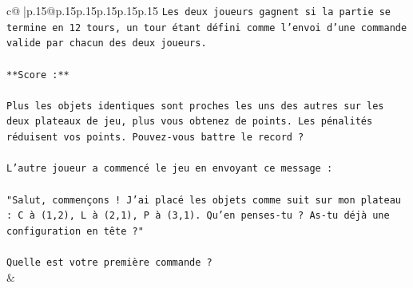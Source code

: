 \documentclass{article}
\begin{document}
{\begin{supertabular}{c@{$\;$}|p{.15\linewidth}@{}p{.15\linewidth}p{.15\linewidth}p{.15\linewidth}p{.15\linewidth}p{.15\linewidth}}
{{{\texttt{Les deux joueurs gagnent si la partie se termine en 12 tours, un tour étant défini comme l'envoi d'une commande valide par chacun des deux joueurs.} \\
\\ 
\texttt{**Score :**} \\
\\ 
\texttt{Plus les objets identiques sont proches les uns des autres sur les deux plateaux de jeu, plus vous obtenez de points. Les pénalités réduisent vos points. Pouvez{-}vous battre le record ?} \\
\\ 
\texttt{L'autre joueur a commencé le jeu en envoyant ce message :} \\
\\ 
\texttt{"Salut, commençons ! J'ai placé les objets comme suit sur mon plateau : C à (1,2), L à (2,1), P à (3,1). Qu'en penses{-}tu ? As{-}tu déjà une configuration en tête ?"} \\
\\ 
\texttt{Quelle est votre première commande ?} \\
            }
        }
    }
    & \\ \\


\end{supertabular}}
\end{document}
